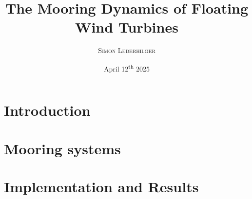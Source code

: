 \documentclass{article}
\title{The Mooring Dynamics of Floating Wind Turbines}
\subtitle{\emph{\headcourse}}
\author{\textsc{Simon Lederhilger}}
\date{April 12\textsuperscript{th} 2025}
\begin{document}
\maketitle\thispagestyle{fancy}
\begin{multicols*}{2}
  \section[Introduction]{Introduction}
  
  
  \section[Mooring]{Mooring systems}
  

  \section[Results]{Implementation and Results}
  
  \printbibliography
\end{multicols*}
\end{document}
